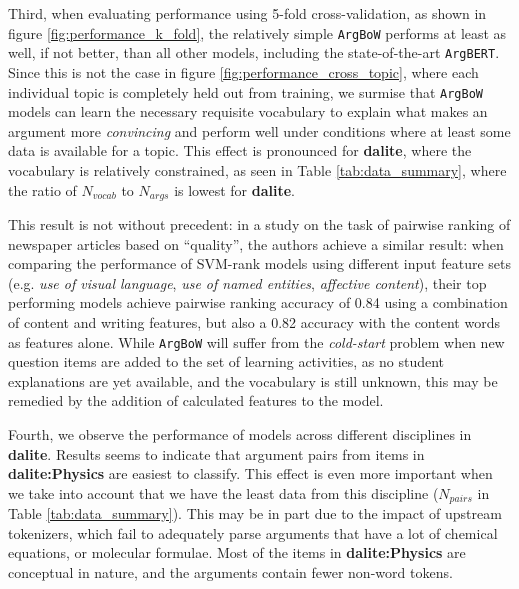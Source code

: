 \documentclass[runningheads]{llncs}
\begin{document}
Third, when evaluating performance using 5-fold cross-validation, as shown in 
figure \ref{fig:performance_k_fold}, the relatively simple \verb|ArgBoW| 
performs at least as well, if not better, than all other models, including the 
state-of-the-art \verb|ArgBERT|.
Since this is not the case in figure \ref{fig:performance_cross_topic}, where 
each individual topic is completely held out from training, we surmise that  
\verb|ArgBoW| models can learn the necessary requisite vocabulary 
to explain what makes an argument more \textit{convincing} and perform well 
under conditions where at least some data is available for a topic. 
This effect is pronounced for \textbf{dalite}, where the vocabulary is 
relatively constrained, as seen in Table \ref{tab:data_summary}, where the 
ratio of $N_{vocab}$ to $N_{args}$ is lowest for \textbf{dalite}. 

This result is not without precedent: in a study on the task of pairwise 
ranking of newspaper articles based on ``quality'', the authors achieve a 
similar result: when comparing the performance of SVM-rank models using 
different input feature sets (e.g. \textit{use of visual language}, \textit{use 
of named entities}, \textit{affective content}), their top performing models 
achieve pairwise ranking accuracy of 0.84 using a combination of content and 
writing features, but also a 0.82 accuracy with the content words as features 
alone\cite{louis_what_2013}.
While \verb|ArgBoW| will suffer from the \textit{cold-start} problem when new 
question items are added to the set of learning activities, as no student 
explanations are yet available, and the vocabulary is still unknown, this may 
be remedied by the addition of calculated features to the model.

Fourth, we observe the performance of models across different disciplines in 
\textbf{dalite}. 
Results seems to indicate that argument pairs from items in 
\textbf{dalite:Physics} are easiest to classify.
This effect is even more important when we take into account that we have the 
least data from this discipline ($N_{pairs}$ in Table \ref{tab:data_summary}).
This may be in part due to the impact of upstream tokenizers, which fail to 
adequately parse arguments that have a lot of chemical equations, or molecular 
formulae.
Most of the items in \textbf{dalite:Physics} are conceptual in nature, and the 
arguments contain fewer non-word tokens.
 
\end{document}
